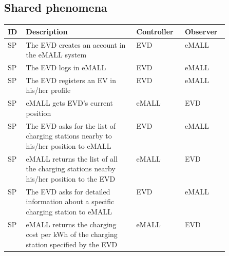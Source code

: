 \subsection{Shared phenomena}
\label{subsec:shared_phenomena}%
\setcounter{sp}{1}
\newcommand{\csp} {\thesp\stepcounter{sp}}
\begin{table}[H]
    \begin{center}
        \begin{longtable}{ |l|p{0.5\linewidth}|l|l| }
            \hline
            \textbf{ID} & \textbf{Description}                                                                                                        & \textbf{Controller} & \textbf{Observer} \\
            \hline
            SP\csp      & The EVD creates an account in the eMALL system                                                                              & EVD                 & eMALL             \\
            \hline
            SP\csp      & The EVD logs in eMALL                                                                                                       & EVD                 & eMALL             \\
            \hline
            SP\csp      & The EVD registers an EV in his/her profile                                                                                  & EVD                 & eMALL             \\
            \hline
            SP\csp      & eMALL gets EVD's current position                                                                                           & eMALL               & EVD               \\
            \hline
            SP\csp      & The EVD asks for the list of charging stations nearby to his/her position to eMALL                                        & EVD                 & eMALL             \\
            \hline
            SP\csp      & eMALL returns the list of all the charging stations nearby his/her position to the EVD                                    & eMALL               & EVD               \\
            \hline
            SP\csp      & The EVD asks for detailed information about a specific charging station to eMALL                                          & EVD                 & eMALL             \\
            \hline
            SP\csp      & eMALL returns the charging cost per kWh of the charging station specified by the EVD                                      & eMALL               & EVD               \\

\end{longtable}
\end{center}
\end{table}
